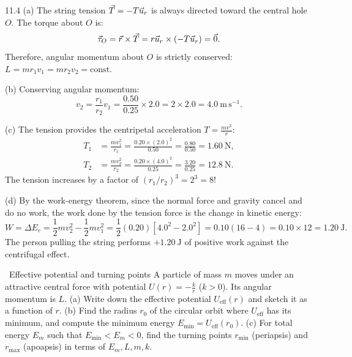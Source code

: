 \begin{tabletworkspace}[6.0cm]
\end{tabletworkspace}

\begin{solution}{11.4}
(a) The string tension $\vec{T} = -T\vec{u}_r$ is always directed toward the central hole $O$. The torque about $O$ is:
\[
\vec{\tau}_O = \vec{r}\times\vec{T} = r\vec{u}_r\times(-T\vec{u}_r) = \vec{0}.
\]
Therefore, angular momentum about $O$ is strictly conserved: $L = m r_1 v_1 = m r_2 v_2 = \text{const}$.

(b) Conserving angular momentum:
\[
v_2 = \frac{r_1}{r_2} v_1 = \frac{0.50}{0.25}\times 2.0 = 2\times 2.0 = \mathbf{4.0\ \mathrm{m\,s^{-1}}.}
\]

(c) The tension provides the centripetal acceleration $T = \frac{m v^2}{r}$:
\begin{align*}
T_1 &= \frac{m v_1^2}{r_1} = \frac{0.20\times (2.0)^2}{0.50} = \frac{0.80}{0.50} = \mathbf{1.60\ \mathrm{N},} \\
T_2 &= \frac{m v_2^2}{r_2} = \frac{0.20\times (4.0)^2}{0.25} = \frac{3.20}{0.25} = \mathbf{12.8\ \mathrm{N}.}
\end{align*}
The tension increases by a factor of $(r_1/r_2)^3 = 2^3 = 8$!

(d) By the work-energy theorem, since the normal force and gravity cancel and do no work, the work done by the tension force is the change in kinetic energy:
\[
W = \Delta E_c = \frac{1}{2}m v_2^2 - \frac{1}{2}m v_1^2 = \frac{1}{2}(0.20)\left[ 4.0^2 - 2.0^2 \right] = 0.10(16 - 4) = 0.10\times 12 = \mathbf{1.20\ \mathrm{J}.}
\]
The person pulling the string performs $+1.20\ \mathrm{J}$ of positive work against the centrifugal effect.
\end{solution}

\begin{exercise}{\core\ Effective potential and turning points}
A particle of mass $m$ moves under an attractive central force with potential $U(r) = -\frac{k}{r}$ ($k > 0$). Its angular momentum is $L$.
(a) Write down the effective potential $U_{\text{eff}}(r)$ and sketch it as a function of $r$.
(b) Find the radius $r_0$ of the circular orbit where $U_{\text{eff}}$ has its minimum, and compute the minimum energy $E_{\min} = U_{\text{eff}}(r_0)$.
(c) For total energy $E_m$ such that $E_{\min} < E_m < 0$, find the turning points $r_{\min}$ (periapsis) and $r_{\max}$ (apoapsis) in terms of $E_m, L, m, k$.
\end{exercise}

\begin{tabletworkspace}[6.5cm]
\end{tabletworkspace}


